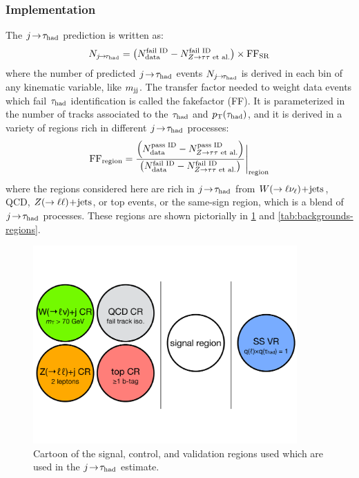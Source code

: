 \clearpage

\subsubsection{Implementation}

The $j\!\rightarrow\!\tau_\text{had}$ prediction is written as:
%
\begin{equation}
  \begin{split}
    N_{\fakes} &= \left(N_\text{data}^\text{fail ID} - N_{\contam}^\text{fail ID}\right) \times \FF_\text{SR} \\
  \end{split}
  \label{eqn:fakes-prediction}
\end{equation}
%
where the number of predicted $j\!\rightarrow\!\tau_\text{had}$ events $N_{j\!\rightarrow\!\tau_\text{had}}$ is derived in each bin of any kinematic variable, like $m_{\text{jj}}$. The transfer factor needed to weight data events which fail $\tau_\text{had}$ identification is called the fakefactor (FF). It is parameterized in the number of tracks associated to the $\tau_\text{had}$ and $p_{\mathrm{T}}(\tau_\text{had})$, and it is derived in a variety of regions rich in different $j\!\rightarrow\!\tau_\text{had}$ processes:
%
\begin{equation}
  \begin{split}
    \FF_\text{region} &= \frac{\left(N_\text{data}^\text{pass ID} - N_{\contam}^\text{pass ID}\right)}{\left(N_\text{data}^\text{fail ID} - N_{\contam}^\text{fail ID}\right)} \Bigg\rvert_\text{region} \\
  \end{split}
  \label{eqn:fakes-fakefactor}
\end{equation}
%
where the regions considered here are rich in $j\!\rightarrow\!\tau_\text{had}$ from $W (\rightarrow \ell\nu_\ell)\!+\!\text{jets}$, QCD, $Z (\rightarrow \ell\ell)\!+\!\text{jets}$, or top events, or the same-sign region, which is a blend of $j\!\rightarrow\!\tau_\text{had}$ processes. These regions are shown pictorially in \cref{fig:backgrounds-regions} and \cref{tab:backgrounds-regions}.

\begin{figure}[tp]
  \centering
  \includegraphics[width=0.90\textwidth]{figures/backgrounds/regions-cartoon}
  \caption{Cartoon of the signal, control, and validation regions used which are used in the $j\!\rightarrow\!\tau_\text{had}$ estimate.}
  \label{fig:backgrounds-regions}
\end{figure}

